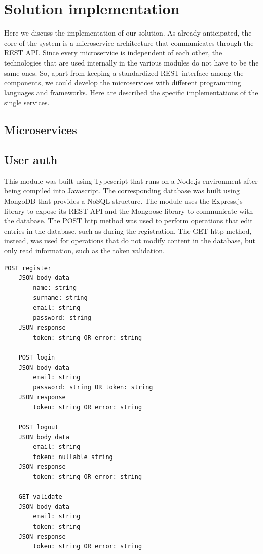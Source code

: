 \section{Solution implementation}
Here we discuss the implementation of our solution. As already anticipated,
the core of the system is a microservice architecture that communicates
through the REST API. Since every microservice is independent of each
other, the technologies that are used internally in the various modules
do not have to be the same ones. So, apart from keeping a standardized REST
interface among the components, we could develop the microservices with
different programming languages and frameworks. Here are described the
specific implementations of the single services.

\subsection{Microservices}


\subsection{User auth}

This module was built using Typescript that runs on a Node.js environment after
being compiled into Javascript. The corresponding database was built using MongoDB
that provides a NoSQL structure. The module uses the Express.js library to expose
its REST API and the Mongoose library to communicate with the database. The POST http
method was used to perform operations that edit entries in the database, such as
during the registration. The GET http method, instead, was used for operations that
do not modify content in the database, but only read information, such as the token
validation.\\


\begin{lstlisting}[language=bash,caption={User auth exposed API}]
    POST register
    JSON body data
        name: string
        surname: string
        email: string
        password: string
    JSON response
        token: string OR error: string
        
    POST login
    JSON body data
        email: string
        password: string OR token: string
    JSON response
        token: string OR error: string

    POST logout
    JSON body data
        email: string
        token: nullable string
    JSON response
        token: string OR error: string
        
    GET validate
    JSON body data
        email: string
        token: string
    JSON response
        token: string OR error: string
\end{lstlisting}


